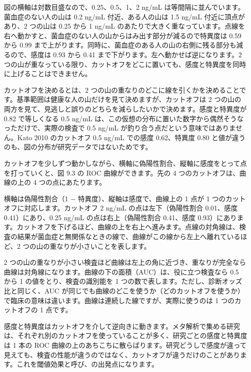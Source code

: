 図の横軸は対数目盛なので、0.25、0.5、1、2 ng/mL は等間隔に並んでいます。菌血症のない人の山は 0.2 ng/mL 付近、ある人の山は 1.5 ng/mL 付近に頂点があり、2 つの山は 0.25 から 1 ng/mL のあたりで大きく重なっています。点線を右へ動かすと、菌血症のない人の山からはみ出す部分が減るので特異度は 0.59 から 0.99 まで上がります。同時に、菌血症のある人の山の右側に残る部分も減るので、感度は 0.93 から 0.41 まで下がります。左へ動かせば逆になります。2 つの山が重なっている限り、カットオフをどこに置いても、感度と特異度を同時に上げることはできません。

カットオフを決めるとは、2 つの山の重なりのどこに線を引くかを決めることです。基準範囲は健康な人の山だけを見て決めますが、カットオフは 2 つの山の両方を見て、見逃しと誤りのどちらを減らしたいかで決めます。感度と特異度が 0.82 で等しくなる 0.5 ng/mL は、この仮想の分布に置いた数字から偶然そうなっただけで、実際の検査で 0.5 ng/mL が釣り合う点だという意味ではありません。Kato 2010 のカットオフ 0.5 ng/mL での感度 0.62、特異度 0.80 と値が違うのも、図の分布が研究データではないためです。

カットオフを少しずつ動かしながら、横軸に偽陽性割合、縦軸に感度をとって点を打っていくと、図 9.3 の ROC 曲線ができます。先の 4 つのカットオフは、曲線の上の 4 つの点にあたります。


横軸は偽陽性割合（1 − 特異度）、縦軸は感度で、曲線上の 1 点が 1 つのカットオフに対応します。カットオフ 2 ng/mL の点は左下（偽陽性割合 0.01、感度 0.41）にあり、0.25 ng/mL の点は右上（偽陽性割合 0.41、感度 0.93）にあります。カットオフを下げるほど、曲線の上を右上へ進みます。点線の対角線は、検査の結果が菌血症と無関係なときの線で、曲線がこの線から左上へ離れているほど、2 つの山の重なりが小さいことを表します。

2 つの山の重なりが小さい検査ほど曲線は左上の角に近づき、重なりが完全なら曲線は対角線になります。曲線の下の面積（AUC）は、役に立つ検査なら 0.5 から 1 の値をとり、検査の識別能を 1 つの数で表します。ただし、診断オッズ比と同じく、AUC が同じでも曲線のどこを使うか（どのカットオフを使うか）で臨床の意味は違います。曲線は連続した線ですが、実際に使うのは 1 つのカットオフの 1 点です。

感度と特異度はカットオフを介して逆向きに動きます。メタ解析で集める研究は、それぞれ別のカットオフを使っていることが多く、研究ごとの感度と特異度は 1 本の ROC 曲線の上のあちこちに散らばります。研究どうしで感度が違って見えても、検査の性能が違うのではなく、カットオフが違うだけのことがあります。これを閾値効果と呼び、の出発点になります。

